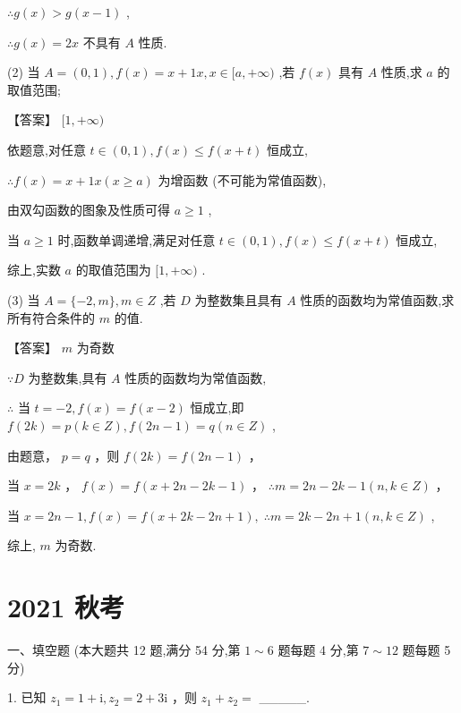 \documentclass[10pt]{article}
\begin{document}
\(\therefore g\left( x\right)  > g\left( {x - 1}\right)\) ,

\(\therefore g\left( x\right)  = {2x}\) 不具有 \(A\) 性质.

(2) 当 \(A = \left( {0,1}\right) ,f\left( x\right)  = x + {1x},x \in  \lbrack a, + \infty )\) ,若 \(f\left( x\right)\) 具有 \(A\) 性质,求 \(a\) 的取值范围;

【答案】 \(\lbrack 1, + \infty )\)

依题意,对任意 \(t \in  \left( {0,1}\right) ,f\left( x\right)  \leq  f\left( {x + t}\right)\) 恒成立,

\(\therefore f\left( x\right)  = x + {1x}\left( {x \geq  a}\right)\) 为增函数 (不可能为常值函数),

由双勾函数的图象及性质可得 \(a \geq  1\) ,

当 \(a \geq  1\) 时,函数单调递增,满足对任意 \(t \in  \left( {0,1}\right) ,f\left( x\right)  \leq  f\left( {x + t}\right)\) 恒成立,

综上,实数 \(a\) 的取值范围为 \(\lbrack 1, + \infty )\) .

(3) 当 \(A = \{  - 2,m\} ,m \in  Z\) ,若 \(D\) 为整数集且具有 \(A\) 性质的函数均为常值函数,求所有符合条件的 \(m\) 的值.

【答案】 \(m\) 为奇数

\(\because D\) 为整数集,具有 \(A\) 性质的函数均为常值函数,

\(\therefore\) 当 \(t =  - 2,f\left( x\right)  = f\left( {x - 2}\right)\) 恒成立,即 \(f\left( {2k}\right)  = p\left( {k \in  Z}\right) ,f\left( {{2n} - 1}\right)  = q\left( {n \in  Z}\right)\) ,

由题意， \(p = q\) ，则 \(f\left( {2k}\right)  = f\left( {{2n} - 1}\right)\) ，

当 \(x = {2k}\) ， \(f\left( x\right)  = f\left( {x + {2n} - {2k} - 1}\right)\) ， \(\therefore m = {2n} - {2k} - 1\left( {n,k \in  Z}\right)\) ，

当 \(x = {2n} - 1,f\left( x\right)  = f\left( {x + {2k} - {2n} + 1}\right) ,\;\therefore m = {2k} - {2n} + 1\left( {n,k \in  Z}\right)\) ,

综上, \(m\) 为奇数.

\section*{2021 秋考}

一、填空题 (本大题共 12 题,满分 54 分,第 \(1 \sim  6\) 题每题 4 分,第 \(7 \sim  {12}\) 题每题 5 分)

1. 已知 \({z}_{1} = 1 + \mathrm{i},{z}_{2} = 2 + 3\mathrm{i}\) ，则 \({z}_{1} + {z}_{2} =\) \_\_\_\_\_.
\end{document}
